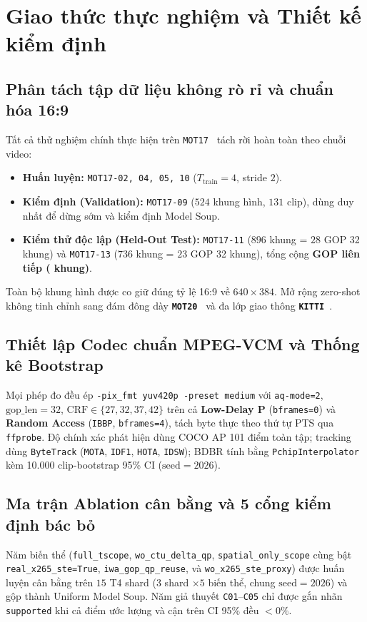 \documentclass[journal]{IEEEtran}
\begin{document}
\section{Giao thức thực nghiệm và Thiết kế kiểm định}
\label{sec:protocol}

\subsection{Phân tách tập dữ liệu không rò rỉ và chuẩn hóa 16:9}
Tất cả thử nghiệm chính thực hiện trên \texttt{MOT17}~\cite{milan2016mot16} tách rời hoàn toàn theo chuỗi video:
\begin{itemize}
    \item \textbf{Huấn luyện:} \texttt{MOT17-02, 04, 05, 10} ($T_{\mathrm{train}}=4$, stride $2$).
    \item \textbf{Kiểm định (Validation):} \texttt{MOT17-09} ($524$ khung hình, $131$ clip), dùng duy nhất để dừng sớm và kiểm định Model Soup.
    \item \textbf{Kiểm thử độc lập (Held-Out Test):} \texttt{MOT17-11} ($896$ khung = $28$ GOP 32 khung) và \texttt{MOT17-13} ($736$ khung = $23$ GOP 32 khung), tổng cộng \textbf{\tscopeEvalClips{} GOP liên tiếp (\tscopeEvalFrames{} khung)}.
\end{itemize}
Toàn bộ khung hình được co giữ đúng tỷ lệ 16:9 về $640\times 384$. Mở rộng zero-shot không tinh chỉnh sang đám đông dày \textbf{\texttt{MOT20}}~\cite{dendorfer2020mot20} và đa lớp giao thông \textbf{\texttt{KITTI}}~\cite{geiger2012kitti}.

\subsection{Thiết lập Codec chuẩn MPEG-VCM và Thống kê Bootstrap}
Mọi phép đo đều ép \texttt{-pix\_fmt yuv420p -preset medium} với \texttt{aq-mode=2}, $\mathrm{gop\_len}=32$, $\mathrm{CRF}\in\{27,32,37,42\}$ trên cả \textbf{Low-Delay P} (\texttt{bframes=0}) và \textbf{Random Access} (\texttt{IBBP}, \texttt{bframes=4}), tách byte thực theo thứ tự PTS qua \texttt{ffprobe}. Độ chính xác phát hiện dùng COCO AP 101 điểm toàn tập; tracking dùng \texttt{ByteTrack} (\texttt{MOTA}, \texttt{IDF1}, \texttt{HOTA}, \texttt{IDSW}); BDBR tính bằng \texttt{PchipInterpolator} kèm 10.000 clip-bootstrap 95\% CI ($\mathrm{seed}=2026$).

\subsection{Ma trận Ablation cân bằng và 5 cổng kiểm định bác bỏ}
Năm biến thể (\texttt{full\_tscope}, \texttt{wo\_ctu\_delta\_qp}, \texttt{spatial\_only\_scope} cùng bật \texttt{real\_x265\_ste=True}, \texttt{iwa\_gop\_qp\_reuse}, và \texttt{wo\_x265\_ste\_proxy}) được huấn luyện cân bằng trên $15$ T4 shard ($3$ shard $\times 5$ biến thể, chung $\mathrm{seed}=2026$) và gộp thành Uniform Model Soup. Năm giả thuyết \texttt{C01}--\texttt{C05} chỉ được gắn nhãn \texttt{supported} khi cả điểm ước lượng và cận trên CI 95\% đều $< 0\%$.
\end{document}
